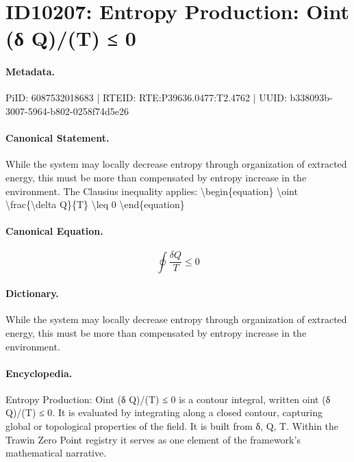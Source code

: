 \section*{ID10207: Entropy Production: Oint (δ Q)/(T) ≤ 0}
\paragraph{Metadata.}
PiID: 6087532018683 | RTEID: RTE:P39636.0477:T2.4762 | UUID: b338093b-3007-5964-b802-0258f74d5e26

\paragraph{Canonical Statement.}
While the system may locally decrease entropy through organization of extracted energy, this must be more than compensated by entropy increase in the environment. The Clausius inequality applies: \textbackslash{}begin\{equation\} \textbackslash{}oint \textbackslash{}frac\{\textbackslash{}delta Q\}\{T\} \textbackslash{}leq 0 \textbackslash{}end\{equation\}

\paragraph{Canonical Equation.}
\[
\oint \frac{\delta Q}{T} \leq 0
\]

\paragraph{Dictionary.}
While the system may locally decrease entropy through organization of extracted energy, this must be more than compensated by entropy increase in the environment.

\paragraph{Encyclopedia.}
Entropy Production: Oint (δ Q)/(T) ≤ 0 is a contour integral, written oint (δ Q)/(T) ≤ 0. It is evaluated by integrating along a closed contour, capturing global or topological properties of the field. It is built from δ, Q, T. Within the Trawin Zero Point registry it serves as one element of the framework's mathematical narrative.

